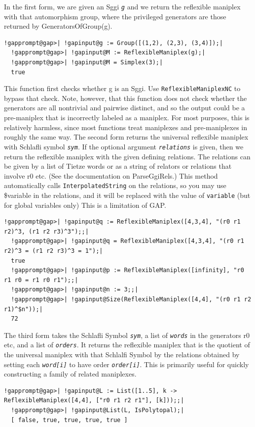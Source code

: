 \documentclass[a4paper,11pt]{report}
\begin{document}
{{{ In the first form, we are given an Sggi \mbox{\texttt{\mdseries\slshape g}} and we return the reflexible maniplex with that automorphism group, where the
privileged generators are those returned by GeneratorsOfGroup(g). 
\begin{Verbatim}[commandchars=!@|,fontsize=\small,frame=single,label=Example]
  !gapprompt@gap>| !gapinput@g := Group([(1,2), (2,3), (3,4)]);|
  !gapprompt@gap>| !gapinput@M := ReflexibleManiplex(g);|
  !gapprompt@gap>| !gapinput@M = Simplex(3);|
  true
\end{Verbatim}
 This function first checks whether g is an Sggi. Use \texttt{ReflexibleManiplexNC} to bypass that check. Note, however, that this function does not check whether
the generators are all nontrivial and pairwise distinct, and so the output
could be a pre-maniplex that is incorrectly labeled as a maniplex. For most
purposes, this is relatively harmless, since most functions treat maniplexes
and pre-maniplexes in roughly the same way. The second form returns the
universal reflexible maniplex with Schlafli symbol \mbox{\texttt{\mdseries\slshape sym}}. If the optional argument \mbox{\texttt{\mdseries\slshape relations}} is given, then we return the reflexible maniplex with the given defining
relations. The relations can be given by a list of Tietze words or as a string
of relators or relations that involve r0 etc. (See the documentation on
ParseGgiRels.) This method automatically calls \texttt{InterpolatedString} on the relations, so you may use \$variable in the relations, and it will be
replaced with the value of \texttt{variable} (but for global variables only) This is a limitation of GAP. 
\begin{Verbatim}[commandchars=!@|,fontsize=\small,frame=single,label=Example]
  !gapprompt@gap>| !gapinput@q := ReflexibleManiplex([4,3,4], "(r0 r1 r2)^3, (r1 r2 r3)^3");;|
  !gapprompt@gap>| !gapinput@q = ReflexibleManiplex([4,3,4], "(r0 r1 r2)^3 = (r1 r2 r3)^3 = 1");|
  true
  !gapprompt@gap>| !gapinput@p := ReflexibleManiplex([infinity], "r0 r1 r0 = r1 r0 r1");;|
  !gapprompt@gap>| !gapinput@n := 3;;|
  !gapprompt@gap>| !gapinput@Size(ReflexibleManiplex([4,4], "(r0 r1 r2 r1)^$n"));|
  72
\end{Verbatim}
 The third form takes the Schlafli Symbol \mbox{\texttt{\mdseries\slshape sym}}, a list of \mbox{\texttt{\mdseries\slshape words}} in the generators r0 etc, and a list of \mbox{\texttt{\mdseries\slshape orders}}. It returns the reflexible maniplex that is the quotient of the universal
maniplex with that Schlalfi Symbol by the relations obtained by setting each \mbox{\texttt{\mdseries\slshape word[i]}} to have order \mbox{\texttt{\mdseries\slshape order[i]}}. This is primarily useful for quickly constructing a family of related
maniplexes. 
\begin{Verbatim}[commandchars=!@|,fontsize=\small,frame=single,label=Example]
  !gapprompt@gap>| !gapinput@L := List([1..5], k -> ReflexibleManiplex([4,4], ["r0 r1 r2 r1"], [k]));;|
  !gapprompt@gap>| !gapinput@List(L, IsPolytopal);|
  [ false, true, true, true, true ]
\end{Verbatim}
 

}}}
\end{document}
